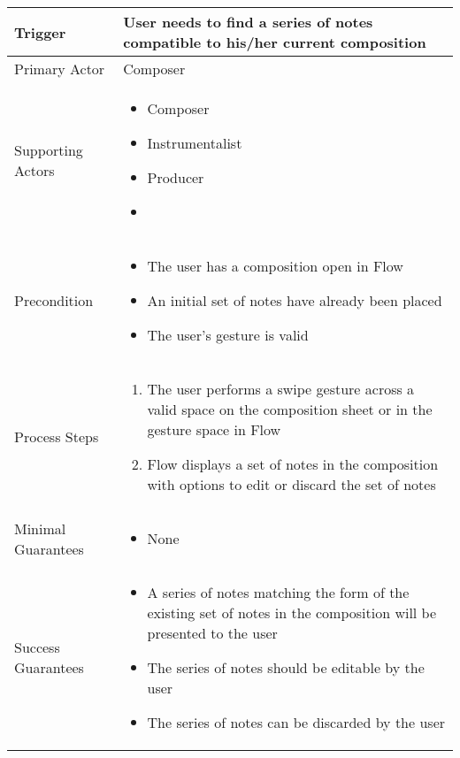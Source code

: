 \begin{longtable}{|X|X|}
\hline
Trigger & User needs to find a series of notes compatible to his/her current composition \\
\hline
Primary Actor & Composer\\
\hline
Supporting Actors & 
\begin{itemize}
\item Composer
\item Instrumentalist
\item Producer
\item
\end{itemize}\\
\hline
Precondition & 
\begin{itemize}
\item The user has a composition open in Flow
\item An initial set of notes have already been placed
\item The user's gesture is valid
\end{itemize}\\
\hline
Process Steps & 
\begin{enumerate}
\item The user performs a swipe gesture across a valid space on the composition sheet or in the gesture space in Flow
\item Flow displays a set of notes in the composition with options to edit or discard the set of notes
\end{enumerate} \\
\hline
Minimal Guarantees &
\begin{itemize}
	\item None
\end{itemize} \\
\hline
Success Guarantees &
\begin{itemize}
	\item A series of notes matching the form of the existing set of notes in the composition will be presented to the user 
	\item The series of notes should be editable by the user
	\item The series of notes can be discarded by the user
\end{itemize} \\
\hline
\end{longtable}
